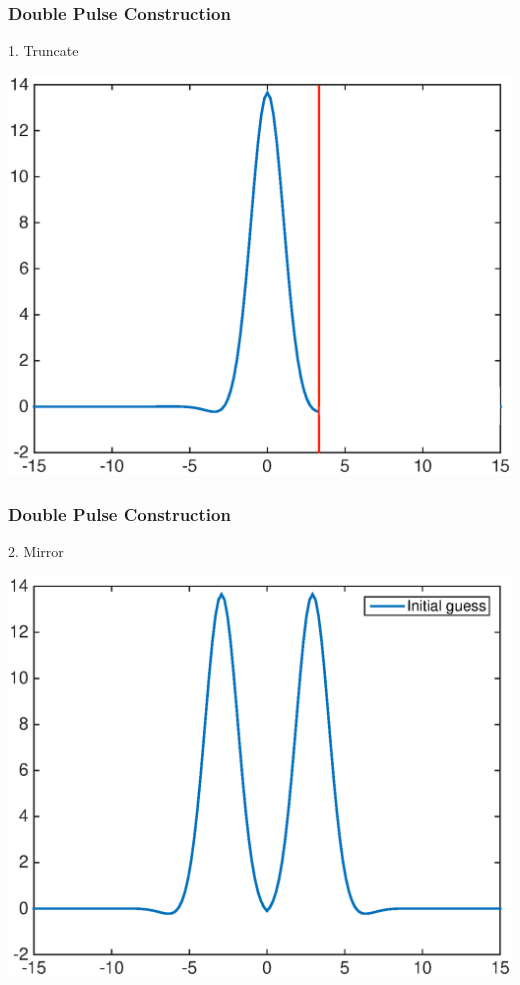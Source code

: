\documentclass[16pt]{beamer}
\begin{document}
\begin{frame}
	\frametitle{Double Pulse Construction}
	1. Truncate
	\begin{center}
	\includegraphics[width=0.8\linewidth]{images/singlecut}
	\end{center}
\end{frame}

\begin{frame}
	\frametitle{Double Pulse Construction}
	2. Mirror
	\begin{center}
	\includegraphics[width=0.8\linewidth]{images/dp1before.eps}
	\end{center}
\end{frame}
\end{document}
